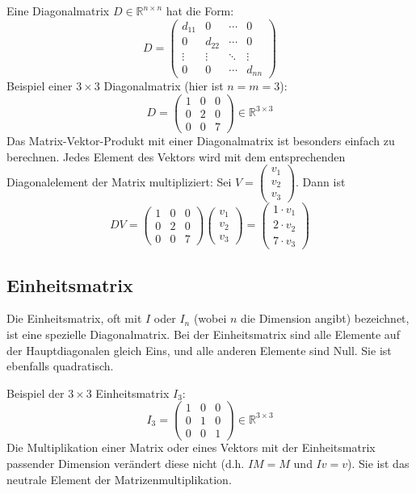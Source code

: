 Eine Diagonalmatrix $D \in \mathbb{R}^{n \times n}$ hat die Form:
\[
D = \begin{pmatrix}
d_{11} & 0 & \cdots & 0 \\
0 & d_{22} & \cdots & 0 \\
\vdots & \vdots & \ddots & \vdots \\
0 & 0 & \cdots & d_{nn}
\end{pmatrix}
\]
Beispiel einer $3 \times 3$ Diagonalmatrix (hier ist $n=m=3$):
\[
   D = \begin{pmatrix}
   1 & 0 & 0 \\
   0 & 2 & 0 \\
   0 & 0 & 7
   \end{pmatrix}
   \in \mathbb{R}^{3 \times 3}
\]
Das Matrix-Vektor-Produkt mit einer Diagonalmatrix ist besonders einfach zu berechnen. Jedes Element des Vektors wird mit dem entsprechenden Diagonalelement der Matrix multipliziert:
Sei $V = \begin{pmatrix}v_1\\v_2\\v_3\end{pmatrix}$. Dann ist
\[
   D V = \begin{pmatrix}
   1 & 0 & 0 \\
   0 & 2 & 0 \\
   0 & 0 & 7
   \end{pmatrix}
   \begin{pmatrix}v_1\\v_2\\v_3\end{pmatrix}
   = \begin{pmatrix}1 \cdot v_1\\2 \cdot v_2\\7 \cdot v_3\end{pmatrix}
\]

\subsection{Einheitsmatrix}

Die Einheitsmatrix, oft mit $I$ oder $I_n$ (wobei $n$ die Dimension angibt) bezeichnet, ist eine spezielle Diagonalmatrix. Bei der Einheitsmatrix sind alle Elemente auf der Hauptdiagonalen gleich Eins, und alle anderen Elemente sind Null. Sie ist ebenfalls quadratisch.

Beispiel der $3 \times 3$ Einheitsmatrix $I_3$:
\[
   I_3 = \begin{pmatrix}
   1 & 0 & 0 \\
   0 & 1 & 0 \\
   0 & 0 & 1
   \end{pmatrix}
   \in \mathbb{R}^{3 \times 3}
\]
Die Multiplikation einer Matrix oder eines Vektors mit der Einheitsmatrix passender Dimension verändert diese nicht (d.h. $IM = M$ und $Iv = v$). Sie ist das neutrale Element der Matrizenmultiplikation.

